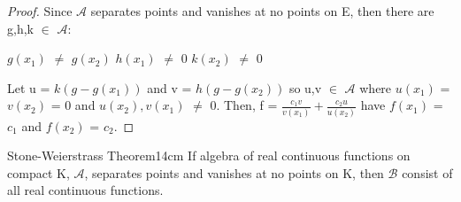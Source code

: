     \begin{proof}
        Since $\mathscr{A}$ separates points and vanishes at no points on E, then
        there are g,h,k $\in$ $\mathscr{A}$:

        \hspace{0.5cm}
        $g(x_1)$ $\not =$ $g(x_2)$
        \hspace{1cm}
        $h(x_1)$ $\not =$ 0
        \hspace{1cm}
        $k(x_2)$ $\not =$ 0

        Let u = $k(g - g(x_1))$ and v = $h(g - g(x_2))$ so u,v $\in$ $\mathscr{A}$
        where $u(x_1)$ = $v(x_2)$ = 0 and $u(x_2),v(x_1)$ $\not =$ 0.
        Then, f = $\frac{c_1v}{v(x_1)} + \frac{c_2u}{u(x_2)}$ have
        $f(x_1)$ = $c_1$ and $f(x_2)$ = $c_2$.
    \end{proof}

    \vspace{0.5cm}



    \begin{wtheorem}{Stone-Weierstrass Theorem}{14cm}
        If algebra of real continuous functions on compact K, $\mathscr{A}$,
        separates points and vanishes at no points on K, then $\mathscr{B}$
        consist of all real continuous functions.    
    \end{wtheorem}

